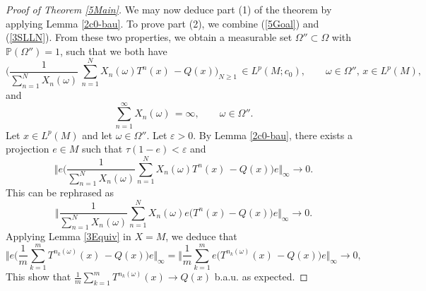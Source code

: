 \documentclass[12pt]{amsart}
\newcommand{\Pdb}{\mbox{$\mathbb{P}$}}
\newcommand{\biggnorm}[1]{\biggl\Vert#1\biggl\Vert}
\theoremstyle{remark}
\theoremstyle{definition}
\numberwithin{equation}{section}
\begin{document}
\begin{proof}[Proof of Theorem \ref{5Main}]
We may now deduce part (1) of the theorem by 
applying Lemma \ref{2c0-bau}. To prove part (2), we combine 
(\ref{5Goal}) and (\ref{3SLLN}). From these two properties,
we obtain a measurable set
$\Omega''\subset\Omega$ with $\Pdb(\Omega'')=1$, such that
we both have
$$
\biggl(\frac{1}{\sum_{n=1}^N X_n(\omega)}\,
\sum_{n=1}^N
X_n(\omega) T^n(x)\, -Q(x)\biggr)_{N\geq 1}\,\in L^p(M;c_0),
\qquad \omega\in\Omega'',\,
x\in L^p(M),
$$
and
$$
\sum_{n=1}^\infty X_n(\omega)\,=\infty,\qquad \omega\in\Omega''.
$$
Let $x\in L^p(M)$ and let $\omega\in\Omega''$. 
Let $\varepsilon>0$. By Lemma \ref{2c0-bau},
there exists a projection $e\in M$ such that $\tau(1-e)<\varepsilon$
and 
$$
\biggnorm{e\biggl(\frac{1}{\sum_{n=1}^N X_n(\omega)} 
\sum_{n=1}^N X_n(\omega) T^n(x) \, - Q(x)
\biggr)e}_\infty\longrightarrow 0.
$$
This can be rephrased as
$$
\biggnorm{\frac{1}{\sum_{n=1}^N X_n(\omega)} 
\sum_{n=1}^N X_n(\omega) e\bigl(T^n(x)  - Q(x)\bigr)e
}_\infty\longrightarrow 0.
$$
Applying  Lemma \ref{3Equiv} in $X=M$, we deduce that
$$
\biggnorm{e\biggl(\frac{1}{m} 
\sum_{k=1}^m T^{n_k(\omega)}(x) \, - Q(x)\biggr)e
}_\infty = 
\biggnorm{\frac{1}{m} 
\sum_{k=1}^m e\bigl(T^{n_k(\omega)}(x) \, - Q(x)\bigr)e
}_\infty\longrightarrow 0,
$$
This show that $\frac{1}{m} 
\sum_{k=1}^m T^{n_k(\omega)}(x)\to Q(x)$ b.a.u. as expected.
\end{proof}
\end{document}
